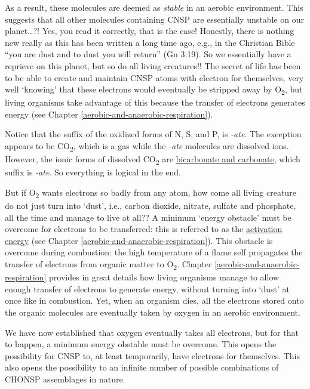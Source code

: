 \documentclass[]{book}
\theoremstyle{definition}
\theoremstyle{definition}
\theoremstyle{definition}
\theoremstyle{remark}
\begin{document}
As a result, these molecules are deemed as \emph{stable} in an aerobic
environment. This suggests that all other molecules containing CNSP are
essentially unstable on our planet\ldots{}?! Yes, you read it correctly,
that is the case! Honestly, there is nothing new really as this has been
written a long time ago, e.g., in the Christian Bible ``you are dust and
to dust you will return'' (Gn 3:19). So we essentially have a reprieve
on this planet, but so do all living creatures!! The secret of life has
been to be able to create and maintain CNSP atoms with electron for
themselves, very well `knowing' that these electrons would eventually be
stripped away by O\textsubscript{2}, but living organisms take advantage
of this because the transfer of electrons generates energy (see Chapter
\ref{aerobic-and-anaerobic-respiration}).

Notice that the suffix of the oxidized forms of N, S, and P, is
\emph{-ate}. The exception appears to be CO\textsubscript{2}, which is a
gas while the \emph{-ate} molecules are dissolved ions. However, the
ionic forms of dissolved CO\textsubscript{2} are
\protect\hyperlink{carbonates}{bicarbonate and carbonate}, which suffix
is \emph{-ate}. So everything is logical in the end.

But if O\textsubscript{2} wants electrons so badly from any atom, how
come all living creature do not just turn into `dust', i.e., carbon
dioxide, nitrate, sulfate and phosphate, all the time and manage to live
at all?? A minimum `energy obstacle' must be overcome for electrons to
be transferred: this is referred to as the
\protect\hyperlink{generating-energy-transfer-of-electrons}{activation
energy} (see Chapter \ref{aerobic-and-anaerobic-respiration}). This
obstacle is overcome during combustion: the high temperature of a flame
self propagates the transfer of electrons from organic matter to
O\textsubscript{2}. Chapter \ref{aerobic-and-anaerobic-respiration}
provides in great details how living organisms manage to allow enough
transfer of electrons to generate energy, without turning into `dust' at
once like in combustion. Yet, when an organism dies, all the electrons
stored onto the organic molecules are eventually taken by oxygen in an
aerobic environment.

We have now established that oxygen eventually takes all electrons, but
for that to happen, a minimum energy obstable must be overcome. This
opens the possibility for CNSP to, at least temporarily, have electrons
for themselves. This also opens the possibility to an infinite number of
possible combinations of CHONSP assemblages in nature.
\end{document}

